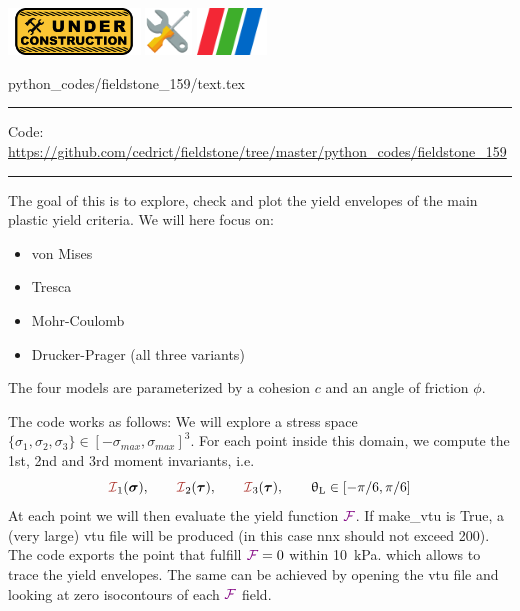 \noindent
\includegraphics[height=1.25cm]{images/pictograms/under_construction}
\includegraphics[height=1.25cm]{images/pictograms/tools}
\includegraphics[height=1.25cm]{images/pictograms/paraview}


\begin{flushright} {\tiny {\color{gray} python\_codes/fieldstone\_159/text.tex}} \end{flushright}

%

\par\noindent\rule{\textwidth}{0.4pt}

\begin{center}
\inpython
{\small Code: \url{https://github.com/cedrict/fieldstone/tree/master/python_codes/fieldstone_159}}
\end{center}

\par\noindent\rule{\textwidth}{0.4pt}


The goal of this \stone is to explore, check and plot the yield envelopes of 
the main plastic yield criteria.
We will here focus on:
\begin{itemize} 
\item von Mises
\item Tresca
\item Mohr-Coulomb
\item Drucker-Prager (all three variants)
\end{itemize} 
The four models are parameterized by a cohesion $c$ and an angle of friction $\phi$. 

The code works as follows: We will explore a stress 
space $\{\sigma_1,\sigma_2,\sigma_3\}\in[-\sigma_{max},\sigma_{max}]^3$.
For each point inside this domain, we compute the 1st, 2nd and 3rd moment invariants, i.e.
\[
\III_1({\bm \sigma}), 
\qquad \III_2({\bm \tau}), 
\qquad \III_3({\bm \tau}), 
\qquad \uptheta_{\rm L}\in[-\pi/6,\pi/6]
\] 
At each point we will then evaluate the yield function ${\color{violet}\cal F}$. 
If {\python make\_vtu} is True, a (very large) vtu file will be produced (in this 
case nnx should not exceed 200).
The code exports the point that fulfill ${\color{violet}\cal F}=0$ within 10~\si{\kilo\pascal}. 
which allows to trace the yield envelopes.
The same can be achieved by opening the vtu file and looking at zero isocontours of each ${\color{violet}\cal F}$ field.

